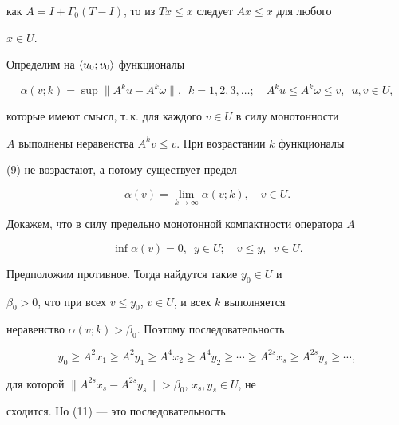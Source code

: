 как $A=I+\Gamma_0(T-I)$, то из $T x\le x$ следует $Ax\le x$ для любого 


$x\in U$. 


 


Определим на $\langle u_0;v_0\rangle$ функционалы 


\begin{equation} 


\alpha(v;k)=\sup\|A^k u-A^k\omega\|,\ \; k=1,2,3,\dotsc;\quad 


A^k u\le A^k\omega\le v,\ \; u,v\in U, 


\end{equation} 


которые имеют смысл, т.\,к. для каждого $v\in U$ в силу монотонности 


$A$ выполнены неравенства $A^k v\le v$. При возрастании $k$ функционалы 


(9) не возрастают, а потому существует предел 


$$ 


\alpha(v)=\lim_{k\to\infty} \alpha(v;k),\quad v\in U. 


$$ 


 


Докажем, что в силу предельно монотонной компактности оператора $A$ 


\begin{equation} 


\inf\alpha(v)=0,\ \; y\in U;\quad v\le y,\ \; v\in U. 


\end{equation} 


Предположим противное. Тогда найдутся такие $y_0\in U$ и 


$\beta_0>0$, что при всех $v\le y_0$, $v\in U$, и всех $k$ выполняется 


неравенство $\alpha(v;k)>\beta_0$. Поэтому последовательность 


\begin{equation} 


y_0\ge A^2x_1\ge A^2 y_1\ge A^4x_2\ge A^4y_2\ge\dotsb\ge 


A^{2s}x_s\ge A^{2s}y_s\ge\dotsb, 


\end{equation} 


для которой $\|A^{2s}x_s-A^{2s}y_s\|>\beta_0$, $x_s,y_s\in U$, не 


сходится. Но (11) --- это последовательность 


